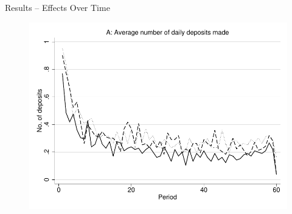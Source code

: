 \documentclass[aspectratio=169]{beamer}
\begin{document}
\begin{frame}{Results -- Effects Over Time}

	\begin{figure}[H]
		\centering
		\includegraphics[height=0.8\textheight]{line-mobile_deposits.pdf}
	\end{figure}

\end{frame}
\end{document}
